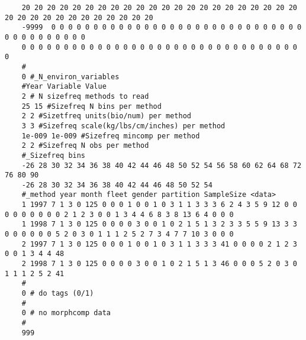\begin{landscape}
{\begin{verbatim}
	20 20 20 20 20 20 20 20 20 20 20 20 20 20 20 20 20 20 20 20 20 20 20 20 20 20 20 20 20 20 20 20 20 20
	-9999  0 0 0 0 0 0 0 0 0 0 0 0 0 0 0 0 0 0 0 0 0 0 0 0 0 0 0 0 0 0 0 0 0 0 0 0 0 0 0 0
	0 0 0 0 0 0 0 0 0 0 0 0 0 0 0 0 0 0 0 0 0 0 0 0 0 0 0 0 0 0 0 0 0 0
	#
	0 #_N_environ_variables
	#Year Variable Value
	2 # N sizefreq methods to read 
	25 15 #Sizefreq N bins per method
	2 2 #Sizetfreq units(bio/num) per method
	3 3 #Sizefreq scale(kg/lbs/cm/inches) per method
	1e-009 1e-009 #Sizefreq mincomp per method 
	2 2 #Sizefreq N obs per method
	#_Sizefreq bins 
	-26 28 30 32 34 36 38 40 42 44 46 48 50 52 54 56 58 60 62 64 68 72 76 80 90
	-26 28 30 32 34 36 38 40 42 44 46 48 50 52 54
	#_method year month fleet gender partition SampleSize <data> 
	1 1997 7 1 3 0 125 0 0 0 1 0 0 1 0 3 1 1 3 3 3 6 2 4 3 5 9 12 0 0 0 0 0 0 0 0 0 2 1 2 3 0 0 1 3 4 4 6 8 3 8 13 6 4 0 0 0
	1 1998 7 1 3 0 125 0 0 0 0 3 0 0 1 0 2 1 5 1 3 2 3 3 5 5 9 13 3 3 0 0 0 0 0 0 5 2 0 3 0 1 1 1 2 5 2 7 3 4 7 7 10 3 0 0 0
	2 1997 7 1 3 0 125 0 0 0 1 0 0 1 0 3 1 1 3 3 3 41 0 0 0 0 2 1 2 3 0 0 1 3 4 4 48
	2 1998 7 1 3 0 125 0 0 0 0 3 0 0 1 0 2 1 5 1 3 46 0 0 0 5 2 0 3 0 1 1 1 2 5 2 41
	#
	0 # do tags (0/1)
	#
	0 # no morphcomp data 
	#
	999
\end{verbatim}
}



\end{landscape}
